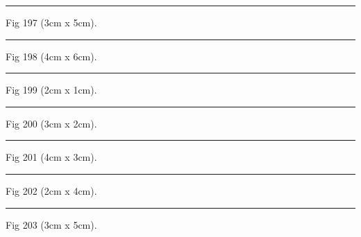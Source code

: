 \documentclass[a4paper,11pt]{article}
\begin{document}
\begin{swarmwrap}%
  \begin{minipage}[t]{3cm}
    \centering
    \rule{\linewidth}{5cm}
    {\footnotesize Fig 197 (3cm x 5cm).}
  \end{minipage}%
\end{swarmwrap}%
\swarmwrapnext
\lipsum[47]%

\begin{swarmwrap}%
  \begin{minipage}[t]{4cm}
    \centering
    \rule{\linewidth}{6cm}
    {\footnotesize Fig 198 (4cm x 6cm).}
  \end{minipage}%
\end{swarmwrap}%
\swarmwrapnext
\lipsum[48]%

\begin{swarmwrap}%
  \begin{minipage}[t]{2cm}
    \centering
    \rule{\linewidth}{1cm}
    {\footnotesize Fig 199 (2cm x 1cm).}
  \end{minipage}%
\end{swarmwrap}%
\swarmwrapnext
\lipsum[49]%

\begin{swarmwrap}%
  \begin{minipage}[t]{3cm}
    \centering
    \rule{\linewidth}{2cm}
    {\footnotesize Fig 200 (3cm x 2cm).}
  \end{minipage}%
\end{swarmwrap}%
\swarmwrapnext
\lipsum[50]%

\begin{swarmwrap}%
  \begin{minipage}[t]{4cm}
    \centering
    \rule{\linewidth}{3cm}
    {\footnotesize Fig 201 (4cm x 3cm).}
  \end{minipage}%
\end{swarmwrap}%
\swarmwrapnext
\lipsum[51]%

\begin{swarmwrap}%
  \begin{minipage}[t]{2cm}
    \centering
    \rule{\linewidth}{4cm}
    {\footnotesize Fig 202 (2cm x 4cm).}
  \end{minipage}%
\end{swarmwrap}%
\swarmwrapnext
\lipsum[52]%

\begin{swarmwrap}%
  \begin{minipage}[t]{3cm}
    \centering
    \rule{\linewidth}{5cm}
    {\footnotesize Fig 203 (3cm x 5cm).}
  \end{minipage}%
\end{swarmwrap}%
\swarmwrapnext
\lipsum[53]%
\end{document}
